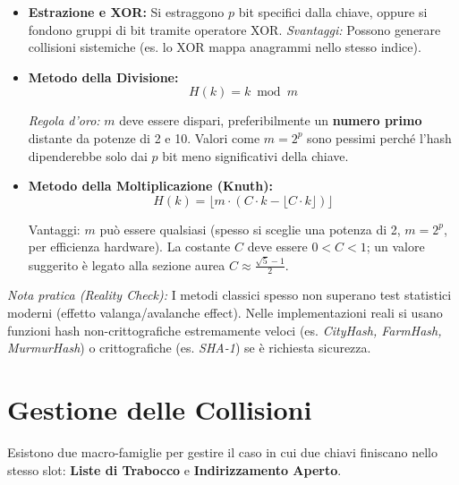 \documentclass[12pt, a4paper]{article}
\begin{document}
\begin{itemize}
\item \textbf{Estrazione e XOR:} Si estraggono $p$ bit specifici dalla chiave, oppure si fondono gruppi di bit tramite operatore XOR. \textit{Svantaggi:} Possono generare collisioni sistemiche (es. lo XOR mappa anagrammi nello stesso indice).


\item \textbf{Metodo della Divisione:}
$$H(k) = k \bmod m$$




\textit{Regola d'oro:} $m$ deve essere dispari, preferibilmente un \textbf{numero primo} distante da potenze di 2 e 10. Valori come $m = 2^p$ sono pessimi perché l'hash dipenderebbe solo dai $p$ bit meno significativi della chiave.


\item \textbf{Metodo della Moltiplicazione (Knuth):}
$$H(k) = \lfloor m \cdot (C \cdot k - \lfloor C \cdot k \rfloor) \rfloor$$




Vantaggi: $m$ può essere qualsiasi (spesso si sceglie una potenza di 2, $m=2^p$, per efficienza hardware). La costante $C$ deve essere $0 < C < 1$; un valore suggerito è legato alla sezione aurea $C \approx \frac{\sqrt{5}-1}{2}$.
\end{itemize}

\textit{Nota pratica (Reality Check):} I metodi classici spesso non superano test statistici moderni (effetto valanga/avalanche effect). Nelle implementazioni reali si usano funzioni hash non-crittografiche estremamente veloci (es. \textit{CityHash, FarmHash, MurmurHash}) o crittografiche (es. \textit{SHA-1}) se è richiesta sicurezza.

\newpage

\section{Gestione delle Collisioni}

Esistono due macro-famiglie per gestire il caso in cui due chiavi finiscano nello stesso slot: \textbf{Liste di Trabocco} e \textbf{Indirizzamento Aperto}.
\end{document}
